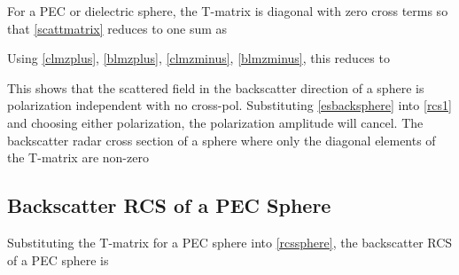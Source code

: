 

For a PEC or dielectric sphere, the T-matrix is diagonal with zero cross terms so that \eqref{scattmatrix} reduces to one sum as 

Using \eqref{clmzplus}, \eqref{blmzplus}, \eqref{clmzminus}, \eqref{blmzminus}, this reduces to

This shows that the scattered field in the backscatter direction of a sphere is polarization independent with no cross-pol. Substituting \eqref{esbacksphere} into \eqref{rcs1} and choosing either polarization, the polarization amplitude will cancel. The backscatter radar cross section of a sphere where only the diagonal elements of the T-matrix are non-zero

\subsection{Backscatter RCS of a PEC Sphere}

Substituting the T-matrix for a PEC sphere into \eqref{rcssphere}, the backscatter RCS of a PEC sphere is


